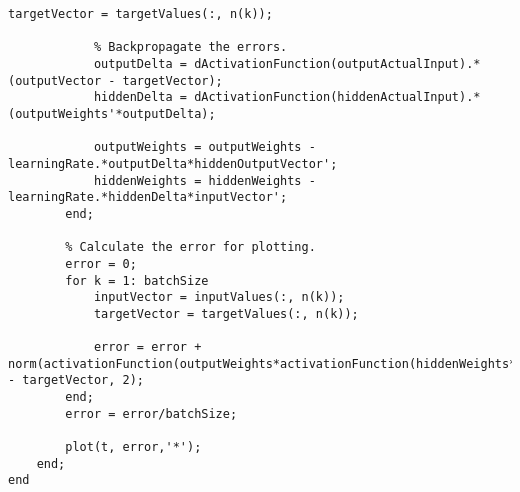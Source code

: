 \documentclass[twoside,11pt,a4paper]{article}
\begin{document}
\begin{lstlisting}[label={lst:train-two-layer-perceptron}]
            targetVector = targetValues(:, n(k));
            
            % Backpropagate the errors.
            outputDelta = dActivationFunction(outputActualInput).*(outputVector - targetVector);
            hiddenDelta = dActivationFunction(hiddenActualInput).*(outputWeights'*outputDelta);
            
            outputWeights = outputWeights - learningRate.*outputDelta*hiddenOutputVector';
            hiddenWeights = hiddenWeights - learningRate.*hiddenDelta*inputVector';
        end;
        
        % Calculate the error for plotting.
        error = 0;
        for k = 1: batchSize
            inputVector = inputValues(:, n(k));
            targetVector = targetValues(:, n(k));
            
            error = error + norm(activationFunction(outputWeights*activationFunction(hiddenWeights*inputVector)) - targetVector, 2);
        end;
        error = error/batchSize;
        
        plot(t, error,'*');
    end;
end
\end{lstlisting}
\end{document}
